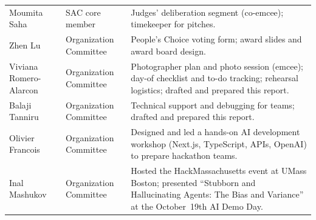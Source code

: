 \documentclass[sigconf,nonacm]{acmart}
\begin{document}
\begin{table}[htbp]
\begin{tabularx}{\textwidth}{@{}p{3.3cm}p{4.2cm}X@{}}
    Moumita Saha & SAC core member & Judges' deliberation segment (co-emcee); timekeeper for pitches. \\
    Zhen Lu & Organization Committee & People's Choice voting form; award slides and award board design. \\
    Viviana Romero-Alarcon & Organization Committee & Photographer plan and photo session (emcee); day-of checklist and to-do tracking; rehearsal logistics; drafted and prepared this report. \\
    Balaji Tanniru & Organization Committee & Technical support and debugging for teams; drafted and prepared this report. \\
    Olivier Francois & Organization Committee & Designed and led a hands-on AI development workshop (Next.js, TypeScript, APIs, OpenAI) to prepare hackathon teams. \\
    Inal Mashukov & Organization Committee & Hosted the HackMassachusetts event at UMass Boston; presented ``Stubborn and Hallucinating Agents: The Bias and Variance'' at the October~19th AI Demo Day. \\
    \bottomrule
  \end{tabularx}


\end{table}

\clearpage
\end{document}
